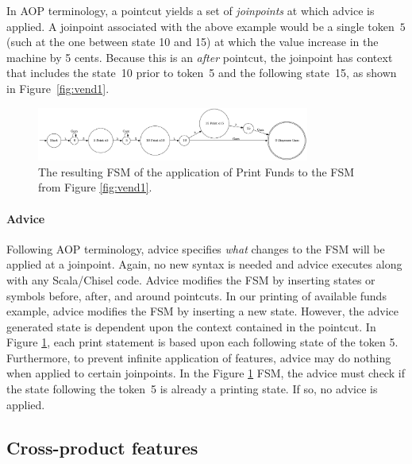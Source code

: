 \documentclass[sigplan,anonymous,review]{acmart}
\begin{document}
In AOP terminology, a pointcut yields a set of \emph{joinpoints} at which advice is applied.  A joinpoint associated with the above example would be a single token~$5$ (such at the one between state 10 and 15) at which the value increase in the machine by 5 cents.  Because this is an \emph{after} pointcut, the joinpoint has context that includes the state~10 prior to token~5 and the following state~15, as shown in Figure~\ref{fig:vend1}. 

\begin{figure}
    \centering
    \includegraphics[width=0.8\textwidth]{figures/vend3.pdf}
    \caption{The resulting FSM of the application of Print Funds to the FSM from Figure \ref{fig:vend1}.}
    \label{fig:applyadvice}
\end{figure}

\paragraph{Advice} Following AOP terminology, advice specifies \emph{what} changes to the FSM will be applied at a joinpoint. Again, no new syntax is needed and advice executes along with any Scala/Chisel code. Advice modifies the FSM by inserting states or symbols before, after, and around pointcuts. In our printing of available funds example, advice modifies the FSM by inserting a new state. However, the advice generated state is dependent upon the context contained in the pointcut. In Figure \ref{fig:applyadvice}, each print statement is based upon each following state of the token 5. Furthermore, to prevent infinite application of features, advice may do nothing when applied to certain joinpoints. In the Figure \ref{fig:applyadvice} FSM, the advice must check if the state following the token~5 is already a printing state. If so, no advice is applied.

\subsection{Cross-product features}\label{sec:cpalg}
\end{document}
